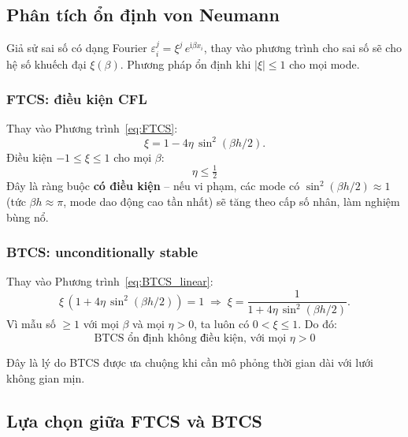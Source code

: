 \documentclass[12pt,a4paper]{article}
\begin{document}
\subsection{Phân tích ổn định von Neumann}

Giả sử sai số có dạng Fourier $\varepsilon_i^j = \xi^j\,e^{\mathrm{i}\beta x_i}$, thay vào phương trình cho sai số sẽ cho hệ số khuếch đại $\xi(\beta)$. Phương pháp ổn định khi $|\xi| \le 1$ cho mọi mode.

\subsubsection{FTCS: điều kiện CFL}

Thay vào Phương trình~\eqref{eq:FTCS}:
\[
    \xi = 1 - 4\eta\,\sin^2(\beta h/2).
\]
Điều kiện $-1 \le \xi \le 1$ cho mọi $\beta$:
\begin{equation}
    \boxed{\; \eta \le \tfrac{1}{2} \;}
    \label{eq:CFL_explicit}
\end{equation}
Đây là ràng buộc \textbf{có điều kiện} -- nếu vi phạm, các mode có $\sin^2(\beta h/2) \approx 1$ (tức $\beta h \approx \pi$, mode dao động cao tần nhất) sẽ tăng theo cấp số nhân, làm nghiệm bùng nổ.

\subsubsection{BTCS: unconditionally stable}

Thay vào Phương trình~\eqref{eq:BTCS_linear}:
\[
    \xi\,(1 + 4\eta\,\sin^2(\beta h/2)) = 1
    \;\Longrightarrow\;
    \xi = \frac{1}{1 + 4\eta\,\sin^2(\beta h/2)}.
\]
Vì mẫu số $\ge 1$ với mọi $\beta$ và mọi $\eta > 0$, ta luôn có $0 < \xi \le 1$. Do đó:
\begin{equation}
    \boxed{\;\text{BTCS ổn định không điều kiện, với mọi } \eta > 0\;}
    \label{eq:unconditional}
\end{equation}

Đây là lý do BTCS được ưa chuộng khi cần mô phỏng thời gian dài với lưới không gian mịn.

\subsection{Lựa chọn giữa FTCS và BTCS}
\end{document}
